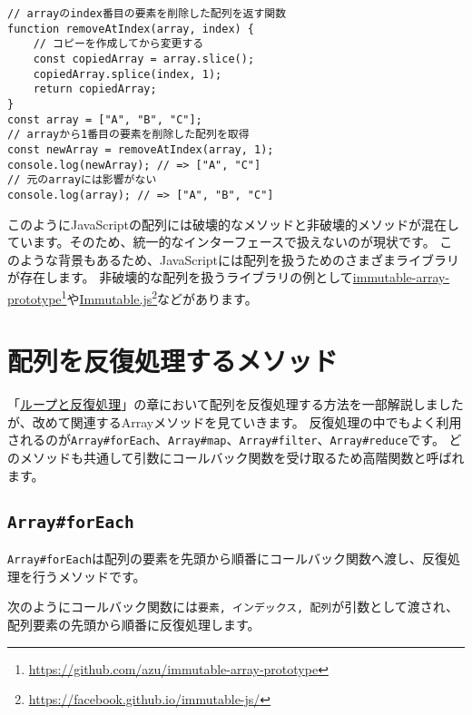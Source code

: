 \begin{lstlisting}
// arrayのindex番目の要素を削除した配列を返す関数
function removeAtIndex(array, index) {
    // コピーを作成してから変更する
    const copiedArray = array.slice();
    copiedArray.splice(index, 1);
    return copiedArray;
}
const array = ["A", "B", "C"];
// arrayから1番目の要素を削除した配列を取得
const newArray = removeAtIndex(array, 1);
console.log(newArray); // => ["A", "C"]
// 元のarrayには影響がない
console.log(array); // => ["A", "B", "C"]
\end{lstlisting}

このようにJavaScriptの配列には破壊的なメソッドと非破壊的メソッドが混在しています。そのため、統一的なインターフェースで扱えないのが現状です。
このような背景もあるため、JavaScriptには配列を扱うためのさまざまライブラリが存在します。
非破壊的な配列を扱うライブラリの例として\href{https://github.com/azu/immutable-array-prototype}{immutable-array-prototype}\footnote{\url{https://github.com/azu/immutable-array-prototype}}や\href{https://facebook.github.io/immutable-js/}{Immutable.js}\footnote{\url{https://facebook.github.io/immutable-js/}}などがあります。

\hypertarget{array-iterate}{%
\section{配列を反復処理するメソッド}\label{array-iterate}}

「\hyperlink{loop-and-iteration}{ループと反復処理}」の章において配列を反復処理する方法を一部解説しましたが、改めて関連するArrayメソッドを見ていきます。
反復処理の中でもよく利用されるのが\texttt{Array\#forEach}、\texttt{Array\#map}、\texttt{Array\#filter}、\texttt{Array\#reduce}です。
どのメソッドも共通して引数にコールバック関数を受け取るため高階関数と呼ばれます。

\hypertarget{array-foreach}{%
\subsection{\texorpdfstring{\texttt{Array\#forEach}}{Array\#forEach}}\label{array-foreach}}

\texttt{Array\#forEach}は配列の要素を先頭から順番にコールバック関数へ渡し、反復処理を行うメソッドです。

次のようにコールバック関数には\texttt{要素, インデックス, 配列}が引数として渡され、配列要素の先頭から順番に反復処理します。

